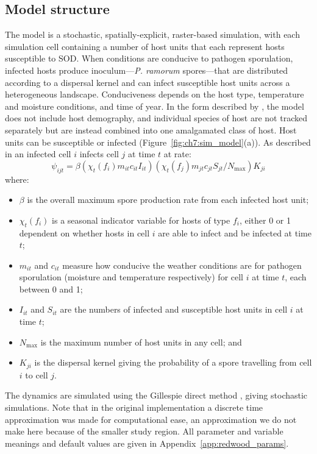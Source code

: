 \subsection{Model structure}

The model is a stochastic, spatially-explicit, raster-based simulation, with each simulation cell containing a number of host units that each represent hosts susceptible to SOD. When conditions are conducive to pathogen sporulation, infected hosts produce inoculum---\emph{P. ramorum} spores---that are distributed according to a dispersal kernel and can infect susceptible host units across a heterogeneous landscape. Conduciveness depends on the host type, temperature and moisture conditions, and time of year. In the form described by \citet{meentemeyer_epidemiological_2011}, the model does not include host demography, and individual species of host are not tracked separately but are instead combined into one amalgamated class of host. Host units can be susceptible or infected (Figure~\ref{fig:ch7:sim_model}(a)). As described in \citet{meentemeyer_epidemiological_2011} an infected cell $i$ infects cell $j$ at time $t$ at rate:
\begin{equation}
    \label{eqn:ch7:inf_rate}
    \psi_{ijt} = \beta\left(\chi_t(f_i)m_{it}c_{it}I_{it}\right)\left(\chi_t(f_j)m_{jt}c_{jt}S_{jt}/N_{\text{max}}\right)K_{ji}
\end{equation}
where:
\begin{itemize}
    \item $\beta$ is the overall maximum spore production rate from each infected host unit;
    \item $\chi_t(f_i)$ is a seasonal indicator variable for hosts of type $f_i$, either 0 or 1 dependent on whether hosts in cell $i$ are able to infect and be infected at time $t$;
    \item $m_{it}$ and $c_{it}$ measure how conducive the weather conditions are for pathogen sporulation (moisture and temperature respectively) for cell $i$ at time $t$, each between 0 and 1;
    \item $I_{it}$ and $S_{it}$ are the numbers of infected and susceptible host units in cell $i$ at time $t$;
    \item $N_{\text{max}}$ is the maximum number of host units in any cell; and
    \item $K_{ji}$ is the dispersal kernel giving the probability of a spore travelling from cell $i$ to cell $j$.
\end{itemize}
The dynamics are simulated using the Gillespie direct method \citep{gillespie_exact_1977}, giving stochastic simulations. Note that in the original implementation a discrete time approximation was made for computational ease, an approximation we do not make here because of the smaller study region. All parameter and variable meanings and default values are given in Appendix~\ref{app:redwood_params}.

